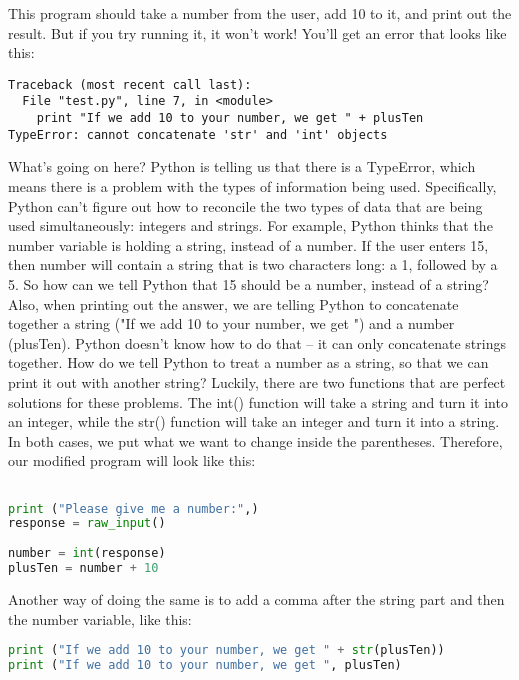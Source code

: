 This program should take a number from the user, add 10 to it, and print out the
result. But if you try running it, it won't work! You'll get an error that looks
like this:
\scriptsize
\begin{verbatim}
Traceback (most recent call last):
  File "test.py", line 7, in <module>
    print "If we add 10 to your number, we get " + plusTen
TypeError: cannot concatenate 'str' and 'int' objects
\end{verbatim}
\normalsize

What's going on here? Python is telling us that there is a TypeError, which
means there is a problem with the types of information being used. Specifically,
Python can't figure out how to reconcile the two types of data that are being
used simultaneously: integers and strings. For example, Python thinks that the
number variable is holding a string, instead of a number. If the user enters 15,
then number will contain a string that is two characters long: a 1, followed by
a 5. So how can we tell Python that 15 should be a number, instead of a string?
Also, when printing out the answer, we are telling Python to concatenate
together a string ("If we add 10 to your number, we get ") and a number
(plusTen). Python doesn't know how to do that -- it can only concatenate strings
together. How do we tell Python to treat a number as a string, so that we can
print it out with another string?  Luckily, there are two functions that are
perfect solutions for these problems. The int() function will take a string and
turn it into an integer, while the str() function will take an integer and turn
it into a string. In both cases, we put what we want to change inside the
parentheses. Therefore, our modified program will look like this:
\lstset{basicstyle=\scriptsize, numbers=left, captionpos=b, tabsize=4}
\begin{lstlisting}[caption=String 10,language={Python},
xleftmargin=15pt, label=lst:string10]

print ("Please give me a number:",)
response = raw_input()
 
number = int(response) 
plusTen = number + 10
\end{lstlisting}
 
Another way of doing the same is to add a comma after the string part and then
the number variable, like this:
\lstset{basicstyle=\scriptsize, numbers=left, captionpos=b, tabsize=4}
\begin{lstlisting}[caption=String 11,language={Python},
xleftmargin=15pt, label=lst:string11]
print ("If we add 10 to your number, we get " + str(plusTen))
print ("If we add 10 to your number, we get ", plusTen)
\end{lstlisting}
